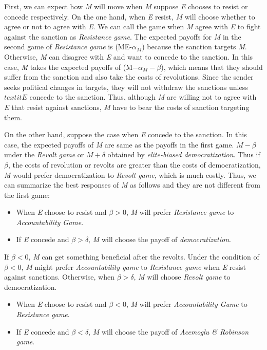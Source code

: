 \documentclass[11pt, letterpage]{article}
\begin{document}
First, we can expect how \textit{M} will move when \textit{M} suppose \textit{E} chooses to resist or concede respectively. On the one hand, when \textit{E} resist, \textit{M} will choose whether to agree or not to agree with \textit{E}. We can call the game when \textit{M} agree with \textit{E} to fight against the sanction as \textit{Resistance game}. The expected payoffs for \textit{M} in the second game of \textit{Resistance game} is (ME-$\alpha_{M}$) because the sanction targets \textit{M}. Otherwise, \textit{M} can disagree with \textit{E} and want to concede to the sanction. In this case, \textit{M} takes the expected payoffs of (M$-\alpha_{M}-\beta$), which means that they should suffer from the sanction and also take the costs of revolutions. Since the sender seeks political changes in targets, they will not withdraw the sanctions unless $textit{E}$ concede to the sanction. Thus, although \textit{M} are willing not to agree with \textit{E} that resist against sanctions, \textit{M} have to bear the costs of sanction targeting them.
	
On the other hand, suppose the case when \textit{E} concede to the sanction. In this case, the expected payoffs of \textit{M} are same as the payoffs in the first game. $M-\beta$ under the \textit{Revolt game} or $M + \delta$ obtained by \textit{elite-biased democratization}. Thus if $\beta$, the costs of revolution or revolts are greater than the costs of democratization, \textit{M} would prefer democratization to \textit{Revolt game}, which is much costly. Thus, we can summarize the best responses of \textit{M} as follows and they are not different from the first game:
	
\begin{itemize}
	\item When \textit{E} choose to resist and $\beta > 0$, \textit{M} will prefer \textit{Resistance game} to \textit{Accountability Game}.
	\item If \textit{E} concede and $\beta > \delta$, \textit{M} will choose the payoff of \textit{democratization}.
\end{itemize}
	
If $\beta < 0$, \textit{M} can get something beneficial after the revolts. Under the condition of $\beta < 0$, \textit{M} might prefer \textit{Accountability game} to \textit{Resistance game} when \textit{E} resist against sanctions. Otherwise, when $\beta > \delta$, \textit{M} will choose \textit{Revolt game} to democratization. 

\begin{itemize}
	\item When \textit{E} choose to resist and $\beta < 0$, \textit{M} will prefer \textit{Accountability Game} to \textit{Resistance game}.
	\item If \textit{E} concede and $\beta < \delta$, \textit{M} will choose the payoff of \textit{Acemoglu \& Robinson game}.
\end{itemize}
	
\end{document}
